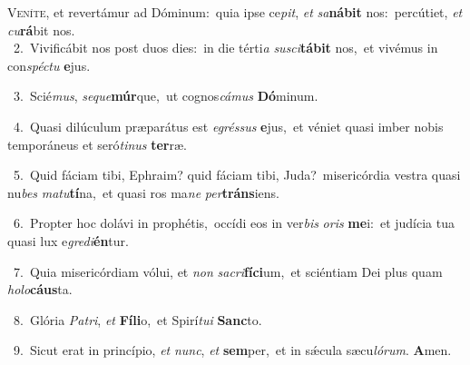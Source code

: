 \lettrine{\initial\textcolor{\initialcolor}{V}}{eníte,} et revertámur ad Dóminum:~\dagger quia ipse ce\-\textit{pit}\-, \textit{et} \textit{sa}\-\textbf{ná}\textbf{bit} nos:~\star percútiet, \textit{et} \textit{cu}\-\textbf{rá}bit nos.\\
{\numbfont\textcolor{\numbcolor}{~2.}}~Vivificábit nos post duos dies:~\dagger in die térti\textit{a} \textit{su}\-\textit{sci}\textbf{tá}\textbf{bit} nos,~\star et vivémus in con\-\textit{spéc}\-\textit{tu} \textbf{e}\-jus.\par
{\numbfont\textcolor{\numbcolor}{~3.}}~Scié\-\textit{mus}\-, \textit{se}\-\textit{que}\textbf{múr}que,~\star ut cognos\-\textit{cá}\-\textit{mus} \textbf{Dó}\-minum.\par
{\numbfont\textcolor{\numbcolor}{~4.}}~Quasi dilúculum præparátus est \textit{e}\-\textit{grés}\textit{sus} \textbf{e}\-jus,~\star et véniet quasi imber nobis temporáneus et seró\-\textit{ti}\-\textit{nus} \textbf{ter}\-ræ.\par
{\numbfont\textcolor{\numbcolor}{~5.}}~Quid fáciam tibi, Ephraim? quid fáciam tibi, Juda?~\dagger misericórdia vestra quasi nu\textit{bes} \textit{ma}\-\textit{tu}\textbf{tí}na,~\star et quasi ros ma\textit{ne} \textit{per}\-\textbf{tráns}iens.\par
{\numbfont\textcolor{\numbcolor}{~6.}}~Propter hoc dolávi in prophétis,~\dagger occídi eos in ver\textit{bis} \textit{o}\-\textit{ris} \textbf{me}\-i:~\star et judícia tua quasi lux e\-\textit{gre}\-\textit{di}\textbf{én}tur.\par
{\numbfont\textcolor{\numbcolor}{~7.}}~Quia misericórdiam vólui, et \textit{non} \textit{sa}\-\textit{cri}\textbf{fí}\textbf{ci}um,~\star et sciéntiam Dei plus quam \textit{ho}\-\textit{lo}\textbf{cáus}ta.\par
{\numbfont\textcolor{\numbcolor}{~8.}}~Glória \textit{Pa}\-\textit{tri}, \textit{et} \textbf{Fí}\-\textbf{li}o,~\star et Spirí\-\textit{tu}\-\textit{i} \textbf{Sanc}\-to.\par
{\numbfont\textcolor{\numbcolor}{~9.}}~Sicut erat in princípio, \textit{et} \textit{nunc}\-, \textit{et} \textbf{sem}\-per,~\star et in sǽcula sæcu\-\textit{ló}\-\textit{rum}. \textbf{A}\-men.\par

